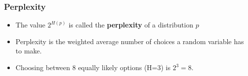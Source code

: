 \begin{comment}
\begin{itemize}[<+->]
\item What is the entropy when the horses are equally likely to win?
\[ H(\textit{uniform distribution}) = - 8 (\frac{1}{8} \times -3) = 3 \textit{ bits} \]
\end{itemize}

\end{frame}

\begin{frame}
\frametitle{Entropy}
\begin{itemize}[<+->]
\item e.g., most likely horse gets code $0$, next most likely gets $10$, and then $110, 1110, \ldots$ \\ {\small many possible coding schemes, this is a simple code to illustrate number of bits needed for a large number of messages \ldots}
\item Assume there are $320$ messages (one for each race): \\
code $0$ occurs 160 times, code $10$ occurs 80 times, code $110$ occurs 40 times, code $1110$ occurs 20 times, code $11110$ occurs 5 times.
\item Total number of bits for all messages: 160*len(0) + 80*len(10) + 40*len(110) + 20*len(1110) + 5*len(11110) 
\item Number of bits: 160*1 + 80*2 + 40*3 + 20*4 + 5*5 = 545
\item Total number of bits per message (per race): $\frac{545}{320} \approx$ 1.7 bits (always less than 2 bits)
\end{itemize}

\end{frame}
\end{comment}

\begin{frame}
\frametitle{Perplexity}
\begin{itemize}[<+->]
\item The value $2^{H(p)}$ is called the {\bf perplexity} of a distribution $p$
\item Perplexity is the weighted average number of choices a random
  variable has to make.
\item Choosing between 8 equally likely options (H=3) is $2^3 = 8$.
\end{itemize}

\end{frame}

